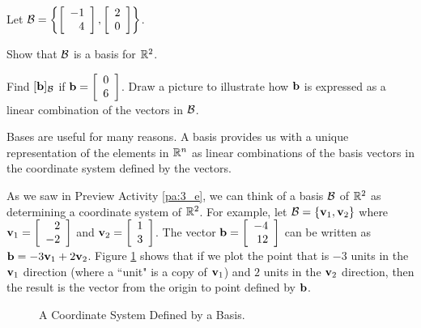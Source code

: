 \begin{pa}
Let $\mathcal{B} = \left\{ \left[ \begin{array}{r} -1 \\ 4 \end{array} \right], \left[ \begin{array}{c} 2 \\ 0 \end{array} \right]\right\}$. 
	\ba
	\item Show that $\mathcal{B}$ is a basis for $\mathbb{R}^2$. 

	\item Find $[\mathbf{b}]_{\mathcal{B}}$ if $\mathbf{b} =  \left[ \begin{array}{c} 0 \\ 6 \end{array} \right]$. Draw a picture to illustrate how $\mathbf{b}$ is expressed as a linear combination of the vectors in $\mathcal{B}$.


	\ea
	
\ee
\end{pa}



\label{sec:coor_base}

Bases are useful for many reasons. A basis provides us with a unique representation of the elements in $\mathbb{R}^n$ as linear combinations of the basis vectors in the coordinate system defined by the vectors. 

As we saw in Preview Activity \ref{pa:3_e}, we can think of a basis $\mathcal{B}$ of $\mathbb{R}^2$ as determining a coordinate system of $\mathbb{R}^2$. For example, let $\mathcal{B} = \{\mathbf{v}_1, \mathbf{v}_2\}$ where $\mathbf{v}_1 = \left[ \begin{array}{r} 2 \\ -2 \end{array} \right]$ and $\mathbf{v}_2 = \left[ \begin{array}{c} 1 \\ 3 \end{array} \right]$. The vector $\mathbf{b} =  \left[ \begin{array}{r} -4 \\ 12 \end{array} \right]$ can be written as $\mathbf{b} = -3\mathbf{v}_1 + 2\mathbf{v}_2$. Figure \ref{F:3_e_1} shows that if we plot the point that is $-3$ units in the $\mathbf{v}_1$ direction (where a ``unit" is a copy of $\mathbf{v}_1$) and $2$ units in the $\mathbf{v}_2$ direction, then the result is the vector from the origin to point defined by $\mathbf{b}$.
\begin{figure}[h]
\begin{center}
\end{center}
\caption{A Coordinate System Defined by a Basis.}
\label{F:3_e_1}
\end{figure}


